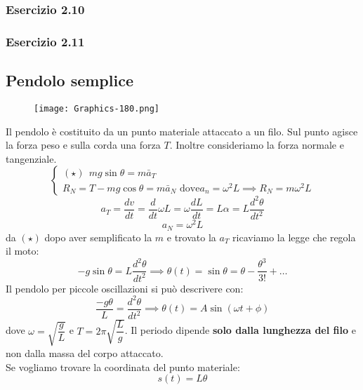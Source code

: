 \documentclass[../../main.tex]{subfiles}
\begin{document}
\subsubsection{Esercizio 2.10}

\subsubsection{Esercizio 2.11}

\subsection{Pendolo semplice}
\begin{figure}[H]
    \centering
    \texttt{[image: Graphics-180.png]}
\end{figure}
Il pendolo è costituito da un punto materiale attaccato a un filo. Sul punto agisce la forza peso e sulla corda una forza $T$. Inoltre consideriamo la forza normale e tangenziale.
\[
    \begin{cases}
        (\star) \ \ mg\sin\theta = m\bar a_T \\
        R_N = T - mg \cos\theta = m\bar a_N \text{ dove} a_n = \omega^2 L \implies R_N = m\omega^2 L
    \end{cases}
\]
\[
    a_T = \dfrac{dv}{dt} = \dfrac{d}{dt}\omega L = \omega \dfrac{dL}{dt} = L\alpha = L\dfrac{d^2\theta}{dt^2}
\]
\[
    a_N = \omega^2 L
\]
da $(\star)$ dopo aver semplificato la $m$ e trovato la $a_T$ ricaviamo la legge che regola il moto:
\[
    - g\sin\theta = L\dfrac{d^2\theta}{dt^2} \implies \theta(t) = \sin\theta = \theta - \dfrac{\theta^3}{3!} + \ldots
\]
Il pendolo per piccole oscillazioni si può descrivere con:
\[
    \dfrac{-g\theta}{L} = \dfrac{d^2\theta}{dt^2} \implies \theta(t) = A\sin(\omega t + \phi)
\]
dove $\omega = \sqrt{\dfrac{g}{L}}$ e $T = 2\pi\sqrt{\dfrac{L}{g}}$. Il periodo dipende \textbf{solo dalla lunghezza del filo} e non dalla massa del corpo attaccato.\\
Se vogliamo trovare la coordinata del punto materiale:
\[
    s(t) = L\theta
\]
\end{document}
